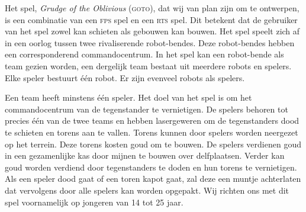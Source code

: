 Het spel, \emph{Grudge of the Oblivious} (\textsc{goto}), dat wij van plan zijn om te ontwerpen, is een combinatie van een \textsc{fps} spel en een \textsc{rts} spel. Dit betekent dat de gebruiker van het spel zowel kan schieten als gebouwen kan bouwen. Het spel speelt zich af in een oorlog tussen twee rivaliserende robot-bendes. Deze robot-bendes hebben een corresponderend commandocentrum. In het spel kan een robot-bende als team gezien worden, een dergelijk team bestaat uit meerdere robots en spelers. Elke speler bestuurt \'e\'en robot. Er zijn evenveel robots als spelers.

Een team heeft minstens \'e\'en speler. Het doel van het spel is om het commandocentrum van de tegenstander te vernietigen. De spelers behoren tot precies \'e\'en van de twee teams en hebben lasergeweren om de tegenstanders dood te schieten en torens aan te vallen. Torens kunnen door spelers worden neergezet op het terrein. Deze torens kosten goud om te bouwen. De spelers verdienen goud in een gezamenlijke kas door mijnen te bouwen over delfplaatsen. Verder kan goud worden verdiend door tegenstanders te doden en hun torens te vernietigen. Als een speler dood gaat of een toren kapot gaat, zal deze een muntje achterlaten dat vervolgens door alle spelers kan worden opgepakt. Wij richten ons met dit spel voornamelijk op jongeren van 14 tot 25 jaar.

